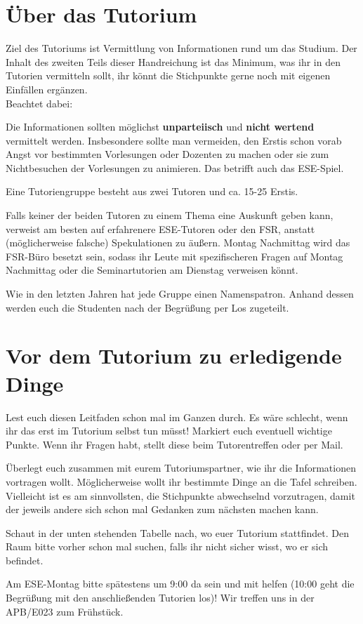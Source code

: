 \documentclass[a4paper,12pt]{report}
\begin{document}
\section{Über das Tutorium}
Ziel des Tutoriums ist Vermittlung von Informationen rund um das Studium. Der Inhalt des zweiten Teils dieser Handreichung ist das Minimum, was ihr in den Tutorien vermitteln sollt, ihr könnt die Stichpunkte gerne noch mit eigenen Einfällen ergänzen.\\
Beachtet dabei:
\begin{itemize*}
\item Die Informationen sollten möglichst \textbf{unparteiisch} und \textbf{nicht wertend} vermittelt werden.
Insbesondere sollte man vermeiden, den Erstis schon vorab Angst vor bestimmten Vorlesungen oder Dozenten zu machen oder sie zum Nichtbesuchen der Vorlesungen zu animieren. Das betrifft auch das ESE-Spiel.
\item Eine Tutoriengruppe besteht aus zwei Tutoren und ca. 15-25 Erstis.
\item Falls keiner der beiden Tutoren zu einem Thema eine Auskunft geben kann, verweist am besten auf erfahrenere ESE-Tutoren oder den FSR, anstatt (möglicherweise falsche) Spekulationen zu äußern. Montag Nachmittag wird das FSR-Büro besetzt sein, sodass ihr Leute mit spezifischeren Fragen auf Montag Nachmittag oder die Seminartutorien am Dienstag verweisen könnt.
\item Wie in den letzten Jahren hat jede Gruppe einen Namenspatron. Anhand dessen werden euch die Studenten nach der Begrüßung per Los zugeteilt.
\end{itemize*}

\section{Vor dem Tutorium zu erledigende Dinge}
\begin{itemize*}
\item Lest euch diesen Leitfaden schon mal im Ganzen durch. 
Es wäre schlecht, wenn ihr das erst im Tutorium selbst tun müsst! 
Markiert euch eventuell wichtige Punkte.
Wenn ihr Fragen habt, stellt diese beim Tutorentreffen oder per Mail.
\item Überlegt euch zusammen mit eurem Tutoriumspartner, wie ihr die Informationen vortragen wollt.
Möglicherweise wollt ihr bestimmte Dinge an die Tafel schreiben.
Vielleicht ist es am sinnvollsten, die Stichpunkte abwechselnd vorzutragen, damit der jeweils andere sich schon mal Gedanken zum nächsten machen kann.
\item Schaut in der unten stehenden Tabelle nach, wo euer Tutorium stattfindet. Den Raum bitte vorher schon mal suchen, falls ihr nicht sicher wisst, wo er sich befindet.
\item Am ESE-Montag bitte spätestens um 9:00 da sein und mit helfen (10:00 geht die Begrüßung mit den anschließenden Tutorien los)!
Wir treffen uns in der APB/E023 zum Frühstück.
\end{itemize*}
\end{document}
